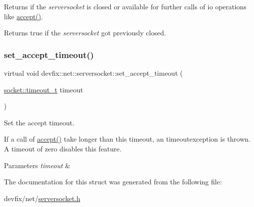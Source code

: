 Returns if the {\itshape serversocket} is closed or available for further calls of io operations like \hyperlink{structdevfix_1_1net_1_1serversocket_a7b3ea6aad486060acdd1385a08f7db81}{accept()}. 

\begin{DoxyReturn}{Returns}
true if the {\itshape serversocket} got previously closed. 
\end{DoxyReturn}
\mbox{\label{structdevfix_1_1net_1_1serversocket_ae67a25cf26fe54ce7b10d07ff9219ce7}} 
\subsubsection{\texorpdfstring{set\+\_\+accept\+\_\+timeout()}{set\_accept\_timeout()}}
{\footnotesize\ttfamily virtual void devfix\+::net\+::serversocket\+::set\+\_\+accept\+\_\+timeout (\begin{DoxyParamCaption}\item[{\hyperlink{structdevfix_1_1net_1_1socket_a80a3bf4cb7292bae31ea9c6575539c68}{socket\+::timeout\+\_\+t}}]{timeout }\end{DoxyParamCaption})\hspace{0.3cm}{\ttfamily [pure virtual]}}



Set the accept timeout. 

If a call of \hyperlink{structdevfix_1_1net_1_1serversocket_a7b3ea6aad486060acdd1385a08f7db81}{accept()} take longer than this timeout, an timeoutexception is thrown. A timeout of zero disables this feature. 
\begin{DoxyParams}{Parameters}
{\em timeout} & \\
\hline
\end{DoxyParams}


The documentation for this struct was generated from the following file\+:\begin{DoxyCompactItemize}
\item 
devfix/net/\hyperlink{serversocket_8h}{serversocket.\+h}\end{DoxyCompactItemize}
